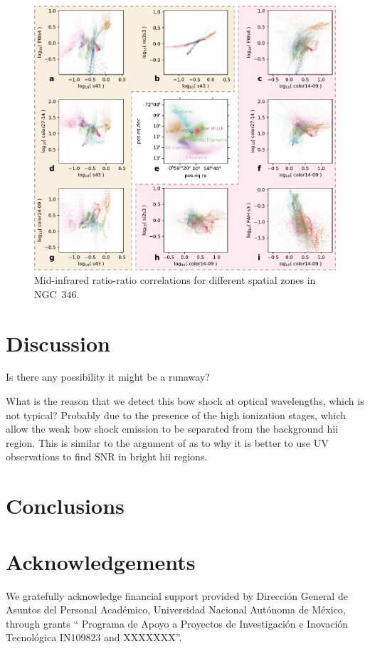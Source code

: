 \documentclass[useAMS, usenatbib, a4paper]{mnras}
\begin{document}
\begin{figure}
  \centering
  \includegraphics[width=\linewidth]{figs/ngc346-midinfrared-ratio-ratio-annotated}
  \caption{
    Mid-infrared ratio-ratio correlations for different spatial zones in NGC~346. 
    }
  \label{fig:infrared-ratios}
\end{figure}




\section{Discussion}
\label{sec:discussion}

Is there any possibility it might be a runaway?

What is the reason that we detect this bow shock
at optical wavelengths, which is not typical?
Probably due to the presence of the high ionization stages,
which allow the weak bow shock emission to be
separated from the background hii region.
This is similar to the argument of \citep{Danforth:2003m}
as to why it is better to use UV observations to find SNR in
bright hii regions. 


\section{Conclusions}
\label{sec:conclusions}

\section*{Acknowledgements}
We gratefully acknowledge financial support provided by
\foreignlanguage{spanish}{%
  Dirección General de Asuntos del Personal Académico,
  Universidad Nacional Autónoma de México},
through grants
``\foreignlanguage{spanish}{%
  Programa de Apoyo a Proyectos de Investigación
  e Inovación Tecnológica IN109823 and XXXXXXX}''.




\bsp

\label{lastpage}
\end{document}
